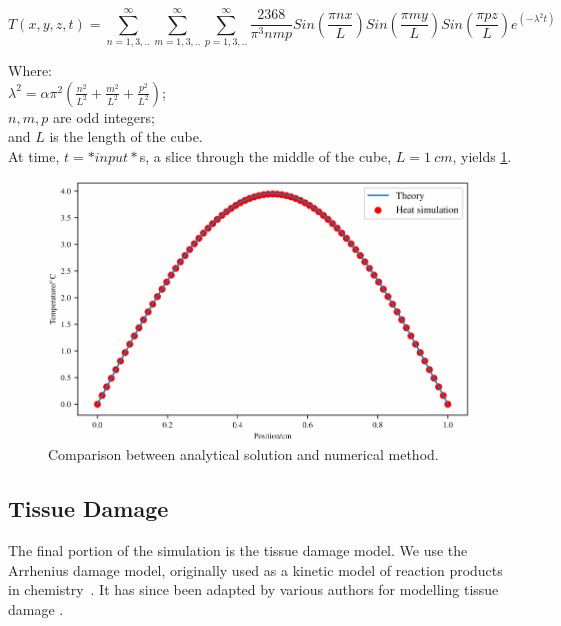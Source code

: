 \begin{equation}
T(x,y,z,t)=\sum^\infty_{n=1,3,..}\sum^\infty_{m=1,3,..}\sum^\infty_{p=1,3,..}\frac{2368}{\pi^3nmp}Sin(\frac{\pi n x}{L})Sin(\frac{\pi m y}{L})Sin(\frac{\pi p z}{L})e^{(-\lambda^2t)}
\end{equation}

\noindent Where:\\
	\indent $\lambda^2=\alpha\pi^2(\tfrac{n^2}{L^2}+\tfrac{m^2}{L^2}+\tfrac{p^2}{L^2})$;\\
	\indent $n,m,p$ are odd integers;\\
	\indent and $L$ is the length of the cube.\\
	
At time, $t=*input*$s, a slice through the middle of the cube, $L=1~cm$,  yields \cref{fig:validation-heat}.

\begin{figure}	
\vspace{-10pt}
	\centering
	\includegraphics[width=\columnwidth]{./ablation/images/validation.pdf}
	\caption{Comparison between analytical solution and numerical method.}
	\label{fig:validation-heat}
	\vspace{-10pt}
\end{figure}	
	
	
\subsection{Tissue Damage}
\label{sec:tissuedamage}
The final portion of the simulation is the tissue damage model. We use the Arrhenius damage model, originally used as a kinetic model of reaction products in chemistry~\cite{pearce2009relationship}. It has since been adapted by various authors for modelling tissue damage \cite{hendriques1947studies,jiang2002effects}.

